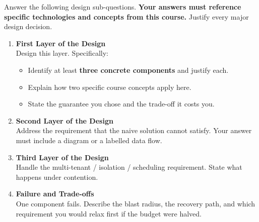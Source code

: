 \vspace{6mm}

Answer the following design sub-questions.
\textbf{Your answers must reference specific technologies and concepts from this course.}
Justify every major design decision.

\vspace{5mm}

\begin{enumerate}[label=(\alph*)]

\item \textbf{First Layer of the Design} \\
Design this layer. Specifically:
\begin{itemize}
    \item Identify at least \textbf{three concrete components} and justify each.
    \item Explain how two specific course concepts apply here.
    \item State the guarantee you chose and the trade-off it costs you.
\end{itemize}

\vspace{85mm}

\newpage
\item \textbf{Second Layer of the Design} \\
Address the requirement that the naive solution cannot satisfy.
Your answer must include a diagram or a labelled data flow.

\vspace{90mm}

\item \textbf{Third Layer of the Design} \\
Handle the multi-tenant / isolation / scheduling requirement.
State what happens under contention.

\vspace{85mm}

\newpage
\item \textbf{Failure and Trade-offs} \\
One component fails. Describe the blast radius, the recovery path,
and which requirement you would relax first if the budget were halved.

\vspace{90mm}

\end{enumerate}
